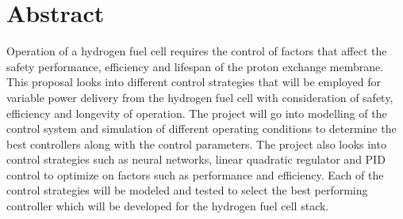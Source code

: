 \section*{Abstract}
\label{sec:}
Operation of a hydrogen fuel cell requires the control of factors that affect the safety performance, efficiency and lifespan of the proton exchange membrane. This proposal  looks into different control strategies that will be employed for variable power delivery from the hydrogen fuel cell with consideration of safety, efficiency and longevity of operation.
The project will go into modelling of the control system and simulation of different operating conditions to determine the best controllers along with the control parameters. The project also  looks into control strategies such as neural networks, linear quadratic regulator and PID control to optimize on factors such as performance and efficiency. Each of the control strategies will be modeled and tested to select the best performing controller which will be developed for the hydrogen fuel cell stack.




